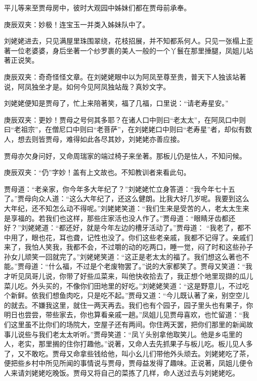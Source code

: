 \begin{parag}
    平儿等来至贾母房中，彼时大观园中姊妹们都在贾母前承奉。\begin{note}庚辰双夹：妙极！连宝玉一并类入姊妹队中了。\end{note}刘姥姥进去，只见满屋里珠围翠绕，花枝招展，并不知都系何人。只见一张榻上歪著一位老婆婆，身后坐著一个纱罗裹的美人一般的一个丫鬟在那里捶腿，凤姐儿站著正说笑。\begin{note}庚辰双夹：奇奇怪怪文章。在刘姥姥眼中以为阿凤至尊至贵，普天下人独该站著说，阿凤独坐才是。如何今见阿凤独站哉？真妙文字。\end{note}刘姥姥便知是贾母了，忙上来陪著笑，福了几福，口里说：“请老寿星安。”\begin{note}庚辰双夹：更妙！贾母之号何其多耶？在诸人口中则曰“老太太”，在阿凤口中则曰“老祖宗”，在僧尼口中则曰“老菩萨”，在刘姥姥口中则曰“老寿星”者，却似有数人，想去则皆贾母，难得如此各尽其妙，刘姥姥亦善应接。\end{note}贾母亦欠身问好，又命周瑞家的端过椅子来坐著。那板儿仍是怯人，不知问候。\begin{note}庚辰双夹：“仍”字妙！盖有上文故也。不知教训者来看此句。\end{note}贾母道：“老亲家，你今年多大年纪了？”刘姥姥忙立身答道：“我今年七十五了。”贾母向众人道：“这么大年纪了，还这么健朗。比我大好几岁呢。我要到这么大年纪，还不知怎么动不得呢。”刘姥姥笑道：“我们生来是受苦的人，老太太生来是享福的。若我们也这样，那些庄家活也没人作了。”贾母道：“眼睛牙齿都还好？”刘姥姥道：“都还好，就是今年左边的槽牙活动了。”贾母道： “我老了，都不中用了，眼也花，耳也聋，记性也没了。你们这些老亲戚，我都不记得了。亲戚们来了，我怕人笑我，我都不会，不过嚼的动的吃两口，睡一觉，闷了时和这些孙子孙女儿顽笑一回就完了。”刘姥姥笑道：“这正是老太太的福了。我们想这么著也不能。”贾母道：“什么福，不过是个老废物罢了。”说的大家都笑了。贾母又笑道：“我才听见凤哥儿说，你带了好些瓜菜来，叫他快收拾去了，我正想个地里现撷的瓜儿菜儿吃。外头买的，不像你们田地里的好吃。”刘姥姥笑道：“这是野意儿，不过吃个新鲜。依我们想鱼肉吃，只是吃不起。”贾母又道：“今儿既认著了亲，别空空儿的就去。不嫌我这里，就住一两天再去。我们也有个园子，园子里头也有果子，你明日也尝尝，带些家去，你也算看亲戚一趟。”凤姐儿见贾母喜欢，也忙留道：“我们这里虽不比你们的场院大，空屋子还有两间。你住两天罢，把你们那里的新闻故事儿说些与我们老太太听听。”贾母笑道：“凤丫头别拿他取笑儿。他是乡屯里的人，老实，那里搁的住你打趣他。”说著，又命人去先抓果子与板儿吃。板儿见人多了，又不敢吃。贾母又命拿些钱给他，叫小幺儿们带他外头顽去。刘姥姥吃了茶，便把些乡村中所见所闻的事情说与贾母，贾母益发得了趣味。正说著，凤姐儿便令人来请刘姥姥吃晚饭。贾母又将自己的菜拣了几样，命人送过去与刘姥姥吃。
\end{parag}


